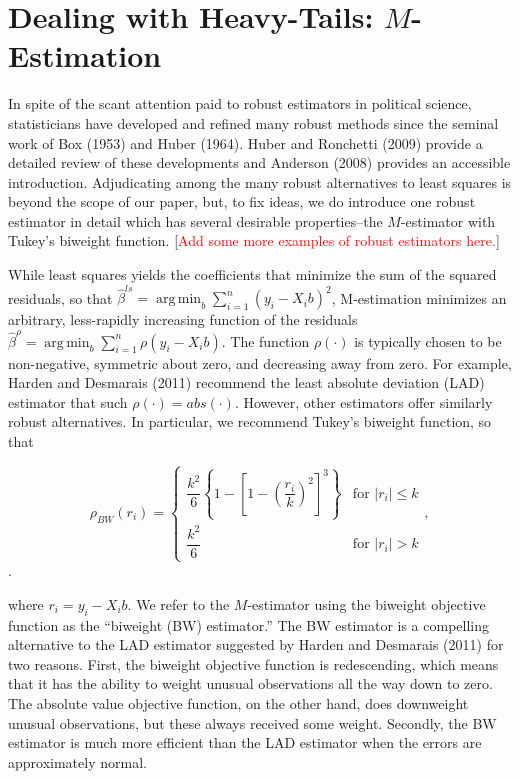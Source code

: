 \documentclass[12pt]{article}
\DeclareMathOperator*{\argmin}{arg\,min}
\newcommand{\ctk}[1]{\textcolor{red}{#1}}
\begin{document}
\section*{Dealing with Heavy-Tails: $M$-Estimation}

In spite of the scant attention paid to robust estimators in political science, statisticians have developed and refined many robust methods since the seminal work of Box (1953) and Huber (1964). Huber and Ronchetti (2009) provide a detailed review of these developments and Anderson (2008) provides an accessible introduction. Adjudicating among the many robust alternatives to least squares is beyond the scope of our paper, but, to fix ideas, we do introduce one robust estimator in detail which has several desirable properties--the $M$-estimator with Tukey's biweight function. [\ctk{Add some more examples of robust estimators here.}]

While least squares yields the coefficients that minimize the sum of the squared residuals, so that $\hat{\beta}^{ls} =\argmin_{b} \sum_{i = 1}^n (y_i - X_ib)^2$, M-estimation minimizes an arbitrary, less-rapidly increasing function of the residuals $\hat{\beta}^{\rho} =\argmin_{b} \sum_{i = 1}^n \rho(y_i - X_ib)$. The function $\rho(\cdot)$ is typically chosen to be non-negative, symmetric about zero, and decreasing away from zero. For example, Harden and Desmarais (2011) recommend the least absolute deviation (LAD) estimator that such $\rho(\cdot) = abs(\cdot)$. However, other estimators offer similarly robust alternatives. In particular, we recommend Tukey's biweight function, so that

\begin{displaymath}
   \rho_{BW}(r_i) = \left\{
     \begin{array}{lr}
       \dfrac{k^2}{6}\left\{ 1 - \left[ 1 - \left( \dfrac{r_i}{k} \right)^2 \right]^3\right\} & \text{for } |r_i| \leq k\\
        \dfrac{k^2}{6} & \text{for } |r_i| > k 
\end{array}
   \right.,
\end{displaymath}.

where $r_i = y_i - X_ib$. We refer to the $M$-estimator using the biweight objective function as the ``biweight (BW) estimator.'' The BW estimator is a compelling alternative to the LAD estimator suggested by Harden and Desmarais (2011) for two reasons. First, the biweight objective function is redescending, which means that it has the ability to weight unusual observations all the way down to zero. The absolute value objective function, on the other hand, does downweight unusual observations, but these always received some weight. Secondly, the BW estimator is much more efficient than the LAD estimator when the errors are approximately normal. 
\end{document}
